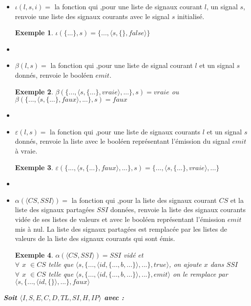 \documentclass[10pt,a4paper]{report}
\newtheorem{ex}{Exemple}
\begin{document}
\begin{itemize}
\item[] $\iota(l,s,i) =$ la fonction qui ,pour une liste de signaux courant $l$, un signal $s$, renvoie une liste des signaux courants avec le signal $s$ initialisé.
\begin{ex}
	$\iota(\{...\},s) = \{...,\langle s,\{\},false\rangle\}$
\end{ex}
\item[]
  
\item[] $\beta(l,s) =$ la fonction qui ,pour une liste de signal courant $l$ et un signal $s$ donnés, renvoie le booléen $emit$.
\begin{ex}
	$\beta(\{...,\langle s,\{...\},vraie\rangle,...\},s) = vraie$ ou $\beta(\{...,\langle s,\{...\},faux\rangle,...\},s) = faux$
\end{ex}
\item[] 

\item[] $\varepsilon(l,s) =$ la fonction qui ,pour une liste de signaux courants $l$ et un signal $s$ donnés, renvoie la liste avec le booléen représentant l'émission du signal $emit$ à vraie.
\begin{ex}
	$\varepsilon(\{...,\langle s,\{...\},faux\rangle,...\},s) = \{...,\langle s,\{...\},vraie\rangle,...\}$
\end{ex}
\item[] 
  
\item[] $\alpha(\langle CS,SSI\rangle) =$ la fonction qui ,pour la liste des signaux courant $CS$ et la liste des signaux partagées $SSI$ données, renvoie la liste des signaux courants vidée de ses listes de valeurs et avec le booléen représentant l'émission $emit$ mis à nul. La liste des signaux partagées est remplacée par les listes de valeurs de la liste des signaux courants qui sont émis.
\begin{ex}
	$\alpha(\langle CS,SSI\rangle) = SSI$ vidé et
	\\ $\forall$ $x$ $\in CS$ telle que $\langle s,\{...,\langle id,\{...,b,...\}\rangle,...\},true\rangle$, on ajoute $x$ dans $SSI$
	\\ $\forall$ $x$ $\in CS$ telle que $\langle s,\{...,\langle id,\{...,b,...\}\rangle,...\},emit\rangle$ on le remplace par $\langle s,\{...,\langle id,\{\}\rangle,...\},faux\rangle$  
\end{ex}
\end{itemize}
\newpage



\textbf{\textit{Soit $\langle I,S,E,C,D,TL,SI,H,IP\rangle$ avec :}}
\end{document}
